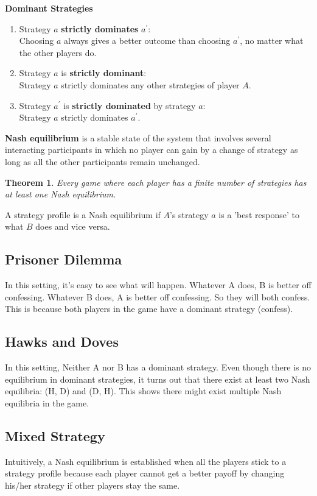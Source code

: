 \documentclass[11pt]{article}
\newtheorem{theorem}{Theorem}
\begin{document}
\textbf{Dominant Strategies}
\begin{enumerate}
  \item Strategy $a$ \textbf{strictly dominates} $a^{\prime}$: \\
  Choosing $a$ always gives a better outcome than choosing $a^{\prime}$, no matter what the other players do.
  \item Strategy $a$ is \textbf{strictly dominant}: \\
  Strategy $a$ strictly dominates any other strategies of player $A$.
  \item Strategy $a^{\prime}$ is \textbf{strictly dominated} by strategy $a$: \\
  Strategy $a$ strictly dominates $a^{\prime}$.
\end{enumerate}
\textbf{Nash equilibrium}
is a stable state of the system that involves several interacting participants in which no player can gain by a change of strategy as long as all the other participants remain unchanged.
\begin{theorem}
Every game where each player has a finite number of strategies has at least one Nash equilibrium.
\end{theorem}
\noindent A strategy profile is a Nash equilibrium if $A$'s strategy $a$ is a 'best response' to what $B$ does and vice versa.

\subsection{Prisoner Dilemma}
In this setting, it's easy to see what will happen. 
Whatever A does, B is better off confessing. Whatever B does, A is better off confessing.
So they will both confess. This is because both players in the game have a dominant strategy (confess).

\subsection{Hawks and Doves}
In this setting, Neither A nor B has a dominant strategy. 
Even though there is no equilibrium in dominant strategies, it turns out that there exist at least two Nash equilibria: (H, D) and (D, H).
This shows there might exist multiple Nash equilibria in the game.

\subsection{Mixed Strategy}
Intuitively, a Nash equilibrium is established when all the players stick to a strategy profile because each player cannot get a better payoff by changing his/her strategy if other players stay the same.
\end{document}
